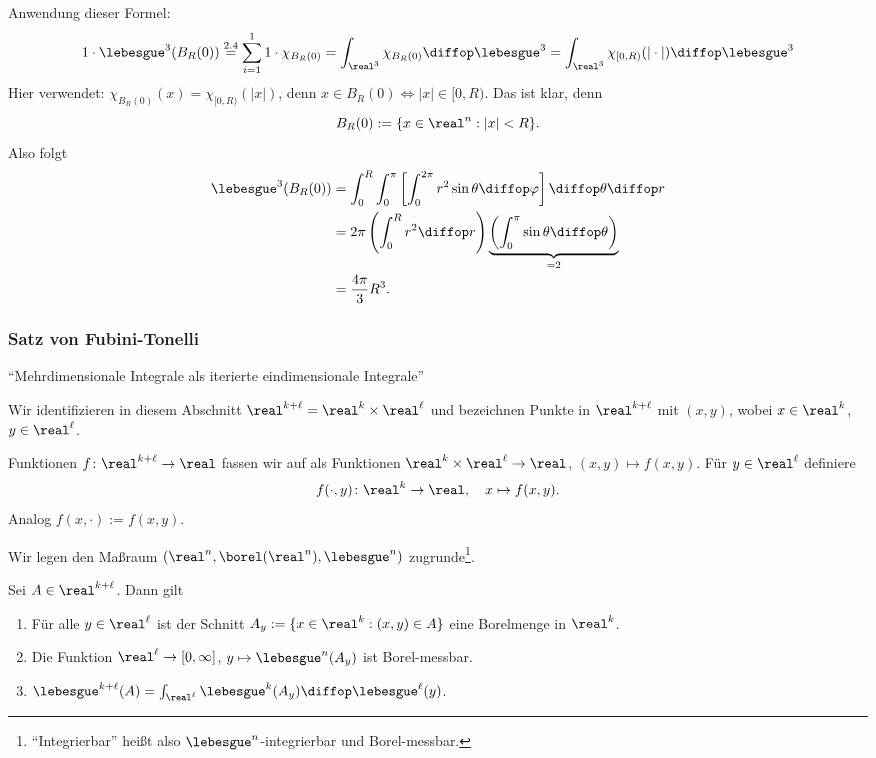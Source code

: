 \begin{exmp}
\begin{enumerate}
   Anwendung dieser Formel: 
   \[ 1\cdot\lebesgue^3( B_R(0) ) \stackrel{\mathrm{2.4}}= \sum_{i=1}^11\cdot\chi_{B_{R}(0)} = \int_{\real^3} \chi_{B_R(0)} \diffop \lebesgue^3 = \int_{\real^3} \chi_{[0,R)}(|\cdot|) \diffop \lebesgue^3 \]
   Hier verwendet: $\chi_{B_R(0)}(x) = \chi_{[0,R)}(|x|)$, denn $x \in B_R(0) \Leftrightarrow |x| \in [0,R)$. Das ist klar, denn
   \[ B_R(0) := \{ x \in \real^n : |x| < R \}. \]
   Also folgt
   \[ \begin{aligned}       
      \lebesgue^3( B_R(0) ) 
      &= \int_0^R \int_0^\pi \left[\int_0^{2 \pi} r^2 \sin \theta \diffop \varphi \right] \diffop \theta \diffop r \\
      &= 2 \pi \left( \int_0^R r^2 \diffop r \right) \underbrace{\left(\int_0^\pi \sin \theta \diffop \theta \right)}_{=2} \\
      &= \frac{4 \pi}{3} R^3.
      \end{aligned} \]
 \end{enumerate}
\end{exmp}

\subsubsection{Satz von Fubini-Tonelli}\label{sect:tonelli}
``Mehrdimensionale Integrale als iterierte eindimensionale Integrale''

Wir identifizieren in diesem Abschnitt $\real^{k+\ell} = \real^k \times \real^\ell$ und bezeichnen Punkte in $\real^{k + \ell}$ mit $(x,y)$, wobei $x \in \real^k$, $y \in \real^\ell$.

Funktionen $f\colon\real^{k+\ell} \to \real$ fassen wir auf als Funktionen $\real^k \times \real^\ell \to \real$, $(x,y) \mapsto f(x,y)$. Für $y \in \real^\ell$ definiere 
\[ f( \cdot, y ) \colon\real^k \to \real, \quad x \mapsto f(x,y). \]
Analog $f( x, \cdot ) := f(x,y)$.

Wir legen den Maßraum $(\real^n, \borel(\real^n), \lebesgue^n)$ zugrunde\footnote{``Integrierbar'' heißt also $\lebesgue^n$-integrierbar und Borel-messbar.}.

\begin{lem}[Cavalieri]
Sei $A \in \real^{k+\ell}$. Dann gilt
\begin{enumerate}
 \item Für alle $y \in \real^\ell$ ist der Schnitt $A_y := \{ x \in \real^k : (x,y) \in A \}$ eine Borelmenge in $\real^k$.
 \item Die Funktion $\real^\ell \to [0,\infty]$, $y \mapsto \lebesgue^n(A_y)$ ist Borel-messbar.
 \item $\lebesgue^{k+\ell} (A) = \int_{\real^\ell} \lebesgue^k (A_y) \diffop \lebesgue^\ell(y)$.
\end{enumerate}
\end{lem}

